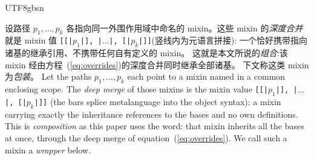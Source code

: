 \begin{CJK*}{UTF8}{gbsn}
\begin{definition}\label{def:merge}
  \ifPaperChinese
  设路径 $p_1, \ldots, p_k$ 各指向同一外围作用域中命名的 mixin。这些 mixin 的\emph{深度合并}
  就是 mixin 值 \texttt{[[|$p_1$|], |$\ldots$|, [|$p_k$|]]}(竖线内为元语言拼接):
  一个恰好携带指向诸基的继承引用、不携带任何自有定义的 mixin。
  这就是本文所说的\emph{组合}:该 mixin
  经由方程~(\ref{eq:overrides})的深度合并同时继承全部诸基。
  下文称这类 mixin 为\emph{包装}。
  \else
  Let the paths $p_1, \ldots, p_k$ each point to a mixin named in a
  common enclosing scope. The \emph{deep merge} of those mixins is
  the mixin value
  \texttt{[[|$p_1$|], |$\ldots$|, [|$p_k$|]]}
  (the bars splice metalanguage into the object syntax):
  a mixin carrying exactly the inheritance references to the bases
  and no own definitions.
  This is \emph{composition} as this paper uses the word: that mixin inherits all the bases
  at once, through the deep merge of
  equation~(\ref{eq:overrides}). We call such a mixin a
  \emph{wrapper} below.
  \fi
\end{definition}


\end{CJK*}
